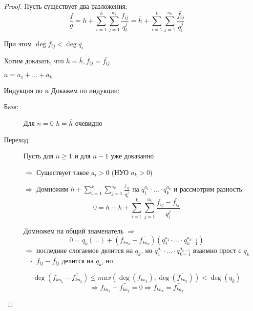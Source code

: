 \begin{proof}
Пусть существует два разложения:
$$\frac{f}{g} = h + \sum_{i=1}^k\sum_{j=1}^{a_k} \frac{f_{ij}}{q_i^j}
 = \bar{h} + \sum_{i=1}^k\sum_{j=1}^{a_k} \frac{\bar{f_{ij}}}{q_i^j}$$

При этом $\deg f_{ij} < \deg q_{i}$

Хотим доказать, что $h = \bar{h}, f_{ij} = \bar{f_{ij}}$

$n = a_1 + \dots + a_k$

Индукция по $n$
Докажем по индукции:
\begin{description}
\item[База:] Для $n = 0$ $h = \bar{h}$
очевидно
\item[Переход:] Пусть для $n \ge 1$ и для $n - 1$ уже доказанно

$\Rightarrow$ Существует такое $a_i > 0$ (НУО $a_k > 0$)

$\Rightarrow$ Домножим $h + \sum_{i=1}^k\sum_{j=1}^{a_k} \frac{f_{ij}}{q_i^j}$ на
$q_1^{a_1} \cdot \dots \cdot q_k^{a_k}$ и рассмотрим разность:
$$0 = h - \bar{h} + \sum_{i=1}^k\sum_{j=1}^{a_k} \frac{f_{ij} - \bar{f_{ij}}}{q_i^j}$$

Домножем на общий знаменатель $\Rightarrow$
$$0 = q_k (\dots) + (f_{ka_k} - \bar{f_{ka_k}})(q_1^{a_1}\cdot\dots\cdot q_{k-1}^{a_{k-1}})$$
$\Rightarrow$ последние слогаемое делится на $q_k$, но $q_1^{a_1}\cdot\dots\cdot q_{k-1}^{a_{k-1}}$
взаимно прост с $q_k$ $\Rightarrow$ $f_{ij} - \bar{f_{ij}}$ делится на $q_k$, но

$$\deg(f_{ka_k} - \bar{f_{ka_k}}) \le max(\deg(f_{ka_k}), \deg(\bar{f_{ka_k}})) < \deg(q_k)$$
$$\Rightarrow f_{ka_k} - \bar{f_{ka_k}} = 0 \Rightarrow f_{ka_k} = \bar{f_{ka_k}}$$
\end{description}
\end{proof}  
